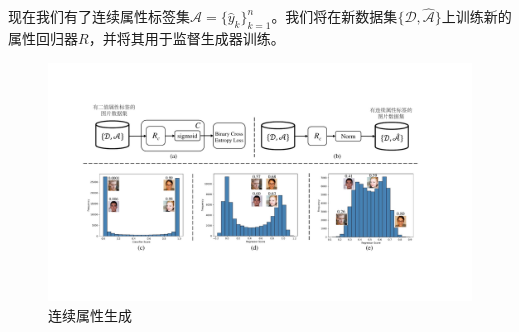 现在我们有了连续属性标签集$\hat{\mathcal{A}}=\{\hat{y}_k\}_{k=1}^n$。我们将在新数据集$\{\mathcal{D}, \hat{\mathcal{A}}\}$上训练新的属性回归器$R$，并将其用于监督生成器训练。


\begin{figure}[!t]
  \centering
  \includegraphics[width=1.0\linewidth]{figures/ACGAN/continue.pdf}
  \caption{连续属性生成}
  \label{fig:quantization}
\end{figure}

